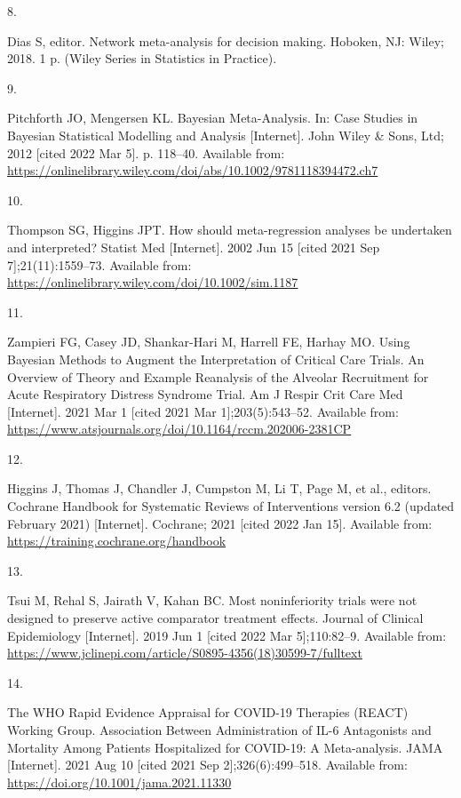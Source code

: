 \documentclass[
  12pt,
]{article}
\newlength{\cslhangindent}
\newlength{\csllabelwidth}
\newlength{\cslentryspacingunit} %
\newenvironment{CSLReferences}[2] %
 {%
  \setlength{\parindent}{0pt}
  \ifodd #1
  \let\oldpar\par
  \def\par{\hangindent=\cslhangindent\oldpar}
  \fi
  \setlength{\parskip}{#2\cslentryspacingunit}
 }%
 {}
\newcommand{\CSLLeftMargin}[1]{\parbox[t]{\csllabelwidth}{#1}}
\newcommand{\CSLRightInline}[1]{\parbox[t]{\linewidth - \csllabelwidth}{#1}\break}
\begin{document}
\begin{CSLReferences}{0}{0}
\leavevmode{}%
\CSLLeftMargin{8. }
\CSLRightInline{Dias S, editor. Network meta-analysis for decision
making. Hoboken, NJ: Wiley; 2018. 1 p. (Wiley Series in Statistics in
Practice). }

\leavevmode{}%
\CSLLeftMargin{9. }
\CSLRightInline{Pitchforth JO, Mengersen KL. Bayesian Meta-Analysis. In:
Case Studies in Bayesian Statistical Modelling and Analysis
{[}Internet{]}. John Wiley \& Sons, Ltd; 2012 {[}cited 2022 Mar 5{]}. p.
118--40. Available from:
\url{https://onlinelibrary.wiley.com/doi/abs/10.1002/9781118394472.ch7}}

\leavevmode{}%
\CSLLeftMargin{10. }
\CSLRightInline{Thompson SG, Higgins JPT. How should meta-regression
analyses be undertaken and interpreted? Statist Med {[}Internet{]}. 2002
Jun 15 {[}cited 2021 Sep 7{]};21(11):1559--73. Available from:
\url{https://onlinelibrary.wiley.com/doi/10.1002/sim.1187}}

\leavevmode{}%
\CSLLeftMargin{11. }
\CSLRightInline{Zampieri FG, Casey JD, Shankar-Hari M, Harrell FE,
Harhay MO. Using Bayesian Methods to Augment the Interpretation of
Critical Care Trials. An Overview of Theory and Example Reanalysis of
the Alveolar Recruitment for Acute Respiratory Distress Syndrome Trial.
Am J Respir Crit Care Med {[}Internet{]}. 2021 Mar 1 {[}cited 2021 Mar
1{]};203(5):543--52. Available from:
\url{https://www.atsjournals.org/doi/10.1164/rccm.202006-2381CP}}

\leavevmode{}%
\CSLLeftMargin{12. }
\CSLRightInline{Higgins J, Thomas J, Chandler J, Cumpston M, Li T, Page
M, et al., editors. Cochrane Handbook for Systematic Reviews of
Interventions version 6.2 (updated February 2021) {[}Internet{]}.
Cochrane; 2021 {[}cited 2022 Jan 15{]}. Available from:
\url{https://training.cochrane.org/handbook}}

\leavevmode{}%
\CSLLeftMargin{13. }
\CSLRightInline{Tsui M, Rehal S, Jairath V, Kahan BC. Most
noninferiority trials were not designed to preserve active comparator
treatment effects. Journal of Clinical Epidemiology {[}Internet{]}. 2019
Jun 1 {[}cited 2022 Mar 5{]};110:82--9. Available from:
\url{https://www.jclinepi.com/article/S0895-4356(18)30599-7/fulltext}}

\leavevmode{}%
\CSLLeftMargin{14. }
\CSLRightInline{The WHO Rapid Evidence Appraisal for COVID-19 Therapies
(REACT) Working Group. Association Between Administration of IL-6
Antagonists and Mortality Among Patients Hospitalized for COVID-19: A
Meta-analysis. JAMA {[}Internet{]}. 2021 Aug 10 {[}cited 2021 Sep
2{]};326(6):499--518. Available from:
\url{https://doi.org/10.1001/jama.2021.11330}}


\end{CSLReferences}
\end{document}
